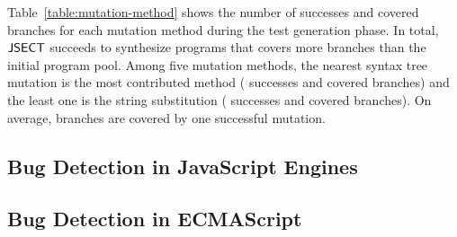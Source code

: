 Table~\ref{table:mutation-method} shows the number of successes and covered
branches for each mutation method during the test generation phase. In total,
$\text{\sf JSECT}$ succeeds to synthesize  programs that covers 
more branches than the initial program pool.  Among five mutation methods, the
nearest syntax tree mutation is the most contributed method (
successes and  covered branches) and the least one is the string
substitution ( successes and  covered branches).  On average,
 branches are covered by one successful mutation.


\subsection{Bug Detection in JavaScript Engines}


\subsection{Bug Detection in ECMAScript}
